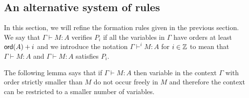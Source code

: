 \subsection{An alternative system of rules}


In this section, we will refine the formation rules
given in the previous section. We say that $\Gamma \vdash M : A$ verifies $P_i$ if all the
variables in $\Gamma$ have orders at least ${\sf ord}(A)+i$ and we introduce the notation $\Gamma \vdash^{i} M : A$ for $i \in
\mathbb{Z}$ to mean that $\Gamma \vdash M : A$ and $\Gamma \vdash M : A$
satisfies $P_i$.


The following lemma says that if $\Gamma \vdash M : A$ then variable in the context $\Gamma$ with order
strictly smaller than $M$ do not occur freely in $M$ and therefore the context can be restricted to a smaller number of variables.

